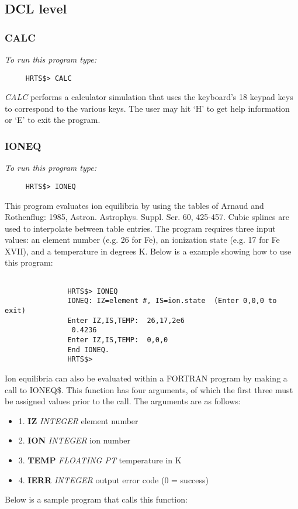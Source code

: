 \subsection{DCL level}

\subsubsection{CALC}

{\em To run this program type:}
\begin{verbatim}
     HRTS$> CALC
\end{verbatim}
       {\em CALC} performs a calculator simulation that uses the keyboard's 18
   keypad keys to correspond to the various keys.
        The user may hit `H' to get help information or `E' to exit the
   program.

\subsubsection{IONEQ}

{\em To run this program type:}
\begin{verbatim}
     HRTS$> IONEQ
\end{verbatim}
      This program evaluates ion equilibria by using the tables of Arnaud
   and Rothenflug: 1985, Astron. Astrophys. Suppl. Ser. 60, 425-457. Cubic
   splines are used to interpolate between table entries.  The program
   requires three input values: an element number (e.g. 26 for Fe), an
   ionization state (e.g. 17 for Fe XVII), and a temperature in degrees K.
   Below is a example showing how to use this program:

\begin{verbatim}

               HRTS$> IONEQ
               IONEQ: IZ=element #, IS=ion.state  (Enter 0,0,0 to exit)
               Enter IZ,IS,TEMP:  26,17,2e6
                0.4236
               Enter IZ,IS,TEMP:  0,0,0
               End IONEQ.
               HRTS$>
\end{verbatim}
            Ion equilibria can also be evaluated within a FORTRAN program by
   making a call to IONEQ\$. This function has four arguments, of which the
   first three must be assigned values prior to the call. The arguments
   are as follows:
\begin{itemize}
\item     1. {\bf IZ}    {\em INTEGER}        element number
\item     2. {\bf ION}   {\em INTEGER}        ion number
\item     3. {\bf TEMP}  {\em FLOATING PT}    temperature in K
\item     4. {\bf IERR}  {\em INTEGER}        output error code (0 = success)
\end{itemize}
        Below is a sample program that calls this function:


